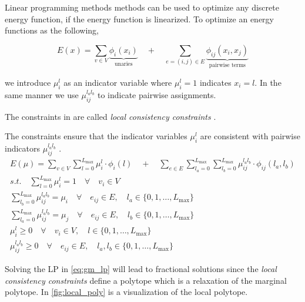 Linear  programming methods methods can be used to optimize 
any discrete energy function, if the energy function is 
linearized.
To optimize an energy functions as the following,

\begin{equation} \label{eq:gm_nl_energy}
    E(x) = 
     \sum_{v \in V}
    \underbrace{
        \phi_i(x_i)
    }_{\text{unaries}}
     \quad +  \quad
     \sum_{e=(i,j) \in E } 
    \underbrace{
        \phi_{ij}(x_i,x_j) 
    }_{\text{pairwise terms}}
\end{equation}

we introduce $\mu_{i}^{l}$ as an indicator variable where $\mu_{i}^{l}=1$ indicates $x_i=l$.
In the same manner we use $\mu_{ij}^{l_a l_b}$ to indicate pairwise 
assignments.

The  constraints in  are
called \emph{local consistency constraints} \citep{sontag_2010_thesis}.

The constraints ensure that the indicator variables $\mu_{i}^{l}$ are consistent 
with pairwise indicators $\mu_{ij}^{l_a l_b}$ .
\begin{align}
    E(\mu) = \sum_{v \in V} \sum_{l=0}^{L_{\text{max}}} \label{eq:gm_lp}
    \mu_{i}^{l} \cdot \phi_{i}( l)
    \quad +  \quad
    \sum_{e \in E} \sum_{l_a=0}^{L_{\text{max}}} \sum_{l_b=0}^{L_{\text{max}}}
    \mu_{ij}^{l_a l_b} \cdot \phi_{ij}( l_a,l_b) \\
    s.t. \quad  \label{eq:gm_lp_s}
    \sum_{l=0}^{L_{\text{max}}} \mu_{i}^{l} = 1 \quad \forall \quad v_i \in V \\
    \sum_{l_b=0}^{L_{\text{max}}} \mu_{ij}^{l_a l_b} = \mu_i 
    \quad \forall \quad e_{ij} \in E, 
    \quad l_a \in \{ 0,1,\ldots,L_{\text{max}} \} \\ 
    \sum_{l_a=0}^{L_{\text{max}}} \mu_{ij}^{l_a l_b} = \mu_j 
    \quad \forall \quad e_{ij} \in E, 
    \quad l_b \in \{ 0,1,\ldots,L_{\text{max}} \} \\ 
    \mu_i^l \geq 0 \quad \forall \quad v_{i} \in V,
    \quad l \in \{ 0,1,\ldots,L_{\text{max}} \}\\
    \mu_{ij}^{l_a l_b} \geq 0 \quad \forall \quad e_{ij} \in E,
    \quad l_a,l_b \in \{ 0,1,\ldots,L_{\text{max}} \} \label{eq:gm_lp_e}
\end{align}

Solving the LP in \cref{eq:gm_lp} will lead to fractional
solutions since the \emph{local consistency constraints} 
define a polytope which is a relaxation
of the marginal polytope.
In \cref{fig:local_poly} is a visualization of the local
polytope.

